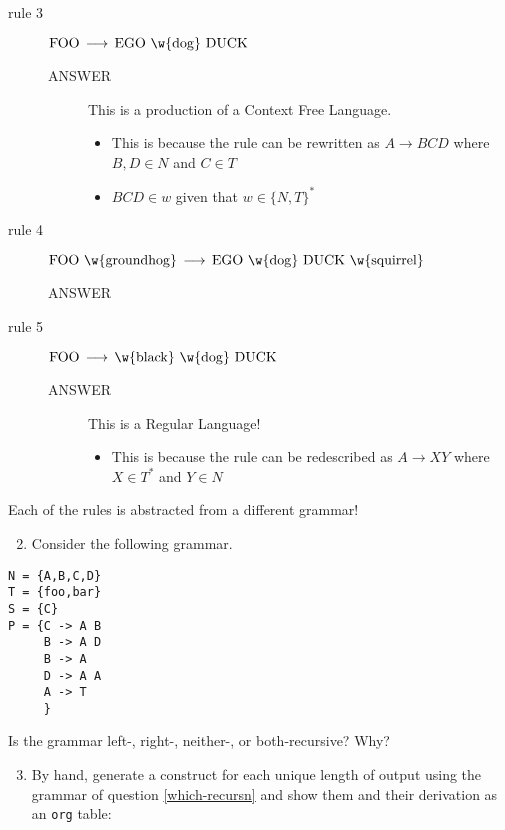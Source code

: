\documentclass[11pt]{article}
\newcommand{\txtgrmr}[2]{\ensuremath{\mathrm{#1} \,\longrightarrow\, \mathrm{#2}}}
\begin{document}
\begin{description}
\item[{rule 3}] \(\txtgrmr{FOO}{EGO \ \w{dog} \ DUCK}\)
\begin{description}
\item[{ANSWER}] This is a production of a Context Free Language.
\begin{itemize}
\item This is because the rule can be rewritten as \(A \rightarrow BCD\) where \(B,D \in N\) and \(C \in T\)
\item \(BCD \in w\) given that \(w \in \{N,T\}^*\)
\end{itemize}
\end{description}
\item[{rule 4}] \(\txtgrmr{FOO \ \w{ground hog}}{EGO \ \w{dog} \ DUCK \ \w{squirrel}}\)
\begin{description}
\item[{ANSWER}] 
\end{description}
\item[{rule 5}] \(\txtgrmr{FOO}{\w{black} \ \w{dog} \ DUCK}\)
\begin{description}
\item[{ANSWER}] This is a Regular Language!
\begin{itemize}
\item This is because the rule can be redescribed as \(A \rightarrow XY\) where \(X \in T^*\) and \(Y \in N\)
\end{itemize}
\end{description}
\end{description}

Each of the rules is abstracted from a different grammar!



\begin{enumerate}
\setcounter{enumi}{1}
\item \label{which-recursn} Consider the following grammar.
\end{enumerate}
\begin{verbatim}
N = {A,B,C,D}
T = {foo,bar}
S = {C}
P = {C -> A B
     B -> A D
     B -> A
     D -> A A
     A -> T
     }
\end{verbatim}
Is the grammar left-, right-, neither-, or both-recursive?  Why?

\begin{enumerate}
\setcounter{enumi}{2}
\item \label{manual-parse} By hand, generate a construct for each unique
length of output using the grammar of question \ref{which-recursn} and show
them and their derivation as an \texttt{org} table:
\end{enumerate}
\end{document}
